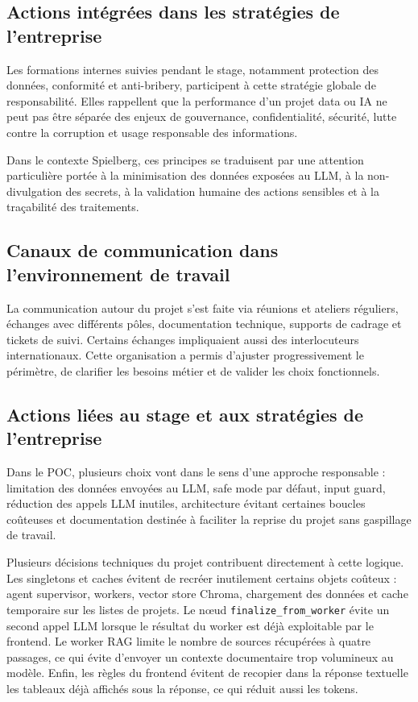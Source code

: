 \documentclass[a4paper,11pt,english,openany]{book}
\begin{document}
\begin{appendices}
\subsection{Actions intégrées dans les stratégies de l'entreprise}

Les formations internes suivies pendant le stage, notamment protection des données, conformité et anti-bribery, participent à cette stratégie globale de responsabilité. Elles rappellent que la performance d'un projet data ou IA ne peut pas être séparée des enjeux de gouvernance, confidentialité, sécurité, lutte contre la corruption et usage responsable des informations.

Dans le contexte Spielberg, ces principes se traduisent par une attention particulière portée à la minimisation des données exposées au LLM, à la non-divulgation des secrets, à la validation humaine des actions sensibles et à la traçabilité des traitements.

\subsection{Canaux de communication dans l'environnement de travail}

La communication autour du projet s'est faite via réunions et ateliers réguliers, échanges avec différents pôles, documentation technique, supports de cadrage et tickets de suivi. Certains échanges impliquaient aussi des interlocuteurs internationaux. Cette organisation a permis d'ajuster progressivement le périmètre, de clarifier les besoins métier et de valider les choix fonctionnels.

\subsection{Actions liées au stage et aux stratégies de l'entreprise}

Dans le POC, plusieurs choix vont dans le sens d'une approche responsable : limitation des données envoyées au LLM, safe mode par défaut, input guard, réduction des appels LLM inutiles, architecture évitant certaines boucles coûteuses et documentation destinée à faciliter la reprise du projet sans gaspillage de travail.

Plusieurs décisions techniques du projet contribuent directement à cette logique. Les singletons et caches évitent de recréer inutilement certains objets coûteux : agent supervisor, workers, vector store Chroma, chargement des données et cache temporaire sur les listes de projets. Le nœud \texttt{finalize\_from\_worker} évite un second appel LLM lorsque le résultat du worker est déjà exploitable par le frontend. Le worker RAG limite le nombre de sources récupérées à quatre passages, ce qui évite d'envoyer un contexte documentaire trop volumineux au modèle. Enfin, les règles du frontend évitent de recopier dans la réponse textuelle les tableaux déjà affichés sous la réponse, ce qui réduit aussi les tokens.


\end{appendices}
\end{document}
